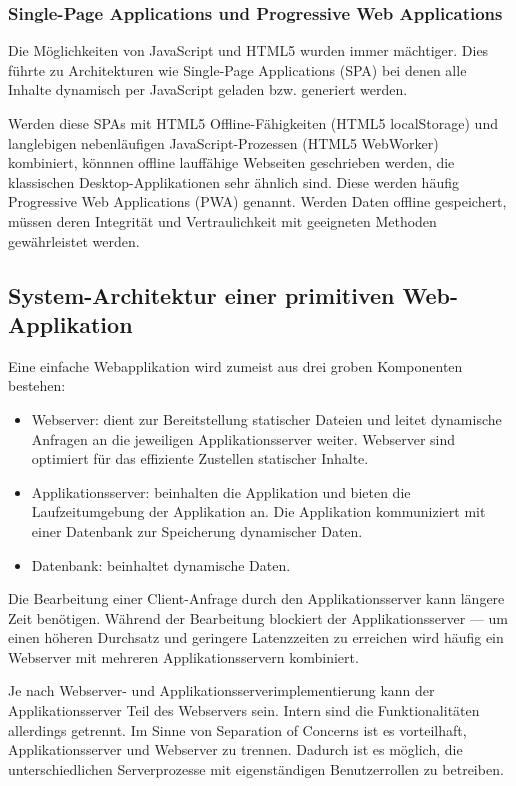 \subsubsection{Single-Page Applications und Progressive Web Applications}

Die Möglichkeiten von JavaScript und HTML5 wurden immer mächtiger. Dies führte zu Architekturen wie Single-Page Applications (SPA) bei denen alle Inhalte dynamisch per JavaScript geladen bzw. generiert werden.

Werden diese SPAs mit HTML5 Offline-Fähigkeiten (HTML5 localStorage) und langlebigen nebenläufigen JavaScript-Prozessen (HTML5 WebWorker) kombiniert, könnnen offline lauffähige Webseiten geschrieben werden, die klassischen Desktop-Applikationen  sehr ähnlich sind. Diese werden häufig Progressive Web Applications (PWA) genannt. Werden Daten offline gespeichert, müssen deren Integrität und Vertraulichkeit mit geeigneten Methoden gewährleistet werden.

\subsection{System-Architektur einer primitiven Web-Applikation}

Eine einfache Webapplikation wird zumeist aus drei groben Komponenten bestehen:

\begin{itemize}
	\item Webserver: dient zur Bereitstellung statischer Dateien und leitet dynamische Anfragen an die jeweiligen Applikationsserver weiter. Webserver sind optimiert für das effiziente Zustellen statischer Inhalte.
	\item Applikationsserver: beinhalten die Applikation und bieten die Laufzeitumgebung der Applikation an. Die Applikation kommuniziert mit einer Datenbank zur Speicherung dynamischer Daten.
	\item Datenbank: beinhaltet dynamische Daten.
\end{itemize}

Die Bearbeitung einer Client-Anfrage durch den Applikationsserver kann längere Zeit benötigen. Während der Bearbeitung blockiert der Applikationsserver --- um einen höheren Durchsatz und geringere Latenzzeiten zu erreichen wird häufig ein Webserver mit mehreren Applikationsservern kombiniert.

Je nach Webserver- und Applikationsserverimplementierung kann der Applikationsserver Teil des Webservers sein. Intern sind die Funktionalitäten allerdings getrennt. Im Sinne von Separation of Concerns ist es vorteilhaft, Applikationsserver und Webserver zu trennen. Dadurch ist es möglich, die unterschiedlichen Serverprozesse mit eigenständigen Benutzerrollen zu betreiben.

